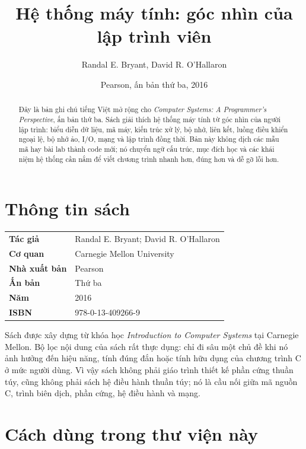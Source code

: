 \documentclass[11pt]{article}
\title{Hệ thống máy tính: góc nhìn của lập trình viên}
\author{Randal E. Bryant, David R. O'Hallaron}
\date{Pearson, ấn bản thứ ba, 2016}
\begin{document}
\maketitle


\renewcommand{\abstractname}{Tóm tắt}
\begin{abstract}
Đây là bản ghi chú tiếng Việt mở rộng cho \emph{Computer Systems: A Programmer's
Perspective}, ấn bản thứ ba. Sách giải thích hệ thống máy tính từ góc nhìn của
người lập trình: biểu diễn dữ liệu, mã máy, kiến trúc xử lý, bộ nhớ, liên kết,
luồng điều khiển ngoại lệ, bộ nhớ ảo, I/O, mạng và lập trình đồng thời. Bản này
không dịch các mẫu mã hay bài lab thành code mới; nó chuyển ngữ cấu trúc, mục
đích học và các khái niệm hệ thống cần nắm để viết chương trình nhanh hơn,
đúng hơn và dễ gỡ lỗi hơn.
\end{abstract}

\section{Thông tin sách}

\begin{center}
\begin{tabular}{ll}
\textbf{Tác giả} & Randal E. Bryant; David R. O'Hallaron \\
\textbf{Cơ quan} & Carnegie Mellon University \\
\textbf{Nhà xuất bản} & Pearson \\
\textbf{Ấn bản} & Thứ ba \\
\textbf{Năm} & 2016 \\
\textbf{ISBN} & 978-0-13-409266-9
\end{tabular}
\end{center}

Sách được xây dựng từ khóa học \emph{Introduction to Computer Systems} tại
Carnegie Mellon. Bộ lọc nội dung của sách rất thực dụng: chỉ đi sâu một chủ đề
khi nó ảnh hưởng đến hiệu năng, tính đúng đắn hoặc tính hữu dụng của chương
trình C ở mức người dùng. Vì vậy sách không phải giáo trình thiết kế phần cứng
thuần túy, cũng không phải sách hệ điều hành thuần túy; nó là cầu nối giữa mã
nguồn C, trình biên dịch, phần cứng, hệ điều hành và mạng.

\section{Cách dùng trong thư viện này}
\end{document}
